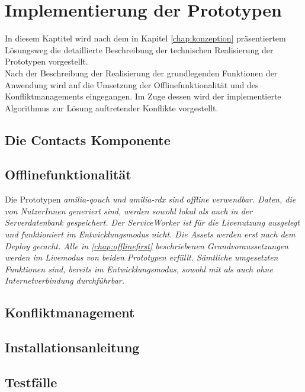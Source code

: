 \chapter{\label{chap:implementierung}Implementierung der Prototypen}
In diesem Kaptitel wird nach dem in Kapitel \ref{chap:konzeption} präsentiertem Lösungsweg die detaillierte Beschreibung der technischen Realisierung der Prototypen vorgestellt.\\
Nach der Beschreibung der Realisierung der grundlegenden Funktionen der Anwendung wird auf die Umsetzung der Offlinefunktionalität und des Konfliktmanagements eingegangen.
Im Zuge dessen wird der implementierte Algorithmus zur Lösung auftretender Konflikte vorgestellt.
%
%
%
\section{Die Contacts Komponente}

%
%
%
\section{Offlinefunktionalität}
Die Prototypen \it{amilia-qouch} und \it{amilia-rdx} sind offline verwendbar.
Daten, die von NutzerInnen generiert sind, werden sowohl lokal als auch in der Serverdatenbank gespeichert.
Der ServiceWorker ist für die Livenutzung ausgelegt und funktioniert im Entwicklungsmodus nicht. Die \gls{Assets} werden erst nach dem Deploy gecacht.
Alle in \autoref{chap:offlinefirst} beschriebenen Grundvoraussetzungen werden im Livemodus von beiden Prototypen erfüllt. Sämtliche umgesetzten Funktionen sind, bereits im Entwicklungsmodus, sowohl mit als auch ohne Internetverbindung durchführbar.
%

%
%
%
\section{\label{chap:konfliktmanagement}Konfliktmanagement}

%
%
\section{Installationsanleitung}


%
%
\section{\label{chap:impl:test}Testfälle}
